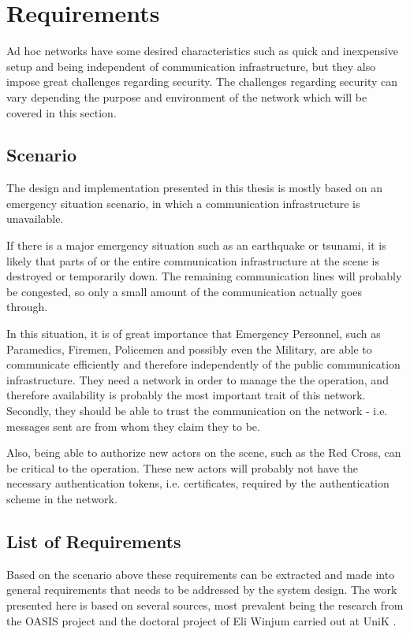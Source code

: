 \section{Requirements}
Ad hoc networks have some desired characteristics such as quick and inexpensive
setup and being independent of communication infrastructure, but they also
impose great challenges regarding security. The challenges regarding security
can vary depending the purpose and environment of the network which will be
covered in this section.

\subsection{Scenario}
The design and implementation presented in this thesis is mostly based on an
emergency situation scenario, in which a communication infrastructure is
unavailable.

If there is a major emergency situation such as an earthquake or tsunami, it is
likely that parts of or the entire communication infrastructure at the scene
is destroyed or temporarily down. The remaining communication lines will
probably be congested, so only a small amount of the communication actually
goes through.

In this situation, it is of great importance that Emergency Personnel, such as
Paramedics, Firemen, Policemen and possibly even the Military, are able to
communicate efficiently and therefore independently of the public communication
infrastructure. They need a network in order to manage the the operation, and
therefore availability is probably the most important trait of this network.
Secondly, they should be able to trust the communication on the network - i.e.
messages sent are from whom they claim they to be.

Also, being able to authorize new actors on the scene, such as the Red Cross,
can be critical to the operation. These new actors will probably not have the
necessary authentication tokens, i.e. certificates, required by the
authentication scheme in the network.

\subsection{List of Requirements}
Based on the scenario above these requirements can be extracted and made into
general requirements that needs to be addressed by the system design. The work
presented here is based on several sources, most prevalent being the research
from the OASIS project \cite{oasis_report} \cite{5683058} \cite{nyre2009secure}
and the doctoral project of Eli Winjum carried out at UniK
\cite{ffi_2005_04015}.

